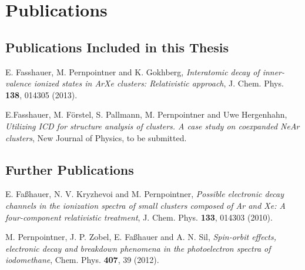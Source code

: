 \chapter*{Publications}

\section*{Publications Included in this Thesis}

  E. Fasshauer, M. Pernpointner and K. Gokhberg,
   \emph{Interatomic decay of inner-valence ionized states in ArXe clusters:
         Relativistic approach},
   J. Chem. Phys. \textbf{138}, 014305 (2013).

\vspace{2ex}

  E.Fasshauer, M. Förstel, S. Pallmann, M. Pernpointner
   and Uwe Hergenhahn,
   \emph{Utilizing ICD for structure analysis of clusters. A case study on
        coexpanded NeAr clusters},
   New Journal of Physics, to be submitted.



\section*{Further Publications}

  E. Faßhauer, N. V. Kryzhevoi and M. Pernpointner,
   \emph{Possible electronic decay channels in the ionization
         spectra of small clusters composed of Ar and Xe: A four-component
         relativistic treatment},
   J. Chem. Phys. \textbf{133}, 014303 (2010).

\vspace{2ex}

  M. Pernpointner, J. P. Zobel, E. Faßhauer and
   A. N. Sil, \emph{Spin-orbit effects, electronic decay and breakdown
                   phenomena in the photoelectron spectra of iodomethane},
   Chem. Phys. \textbf{407}, 39 (2012).
